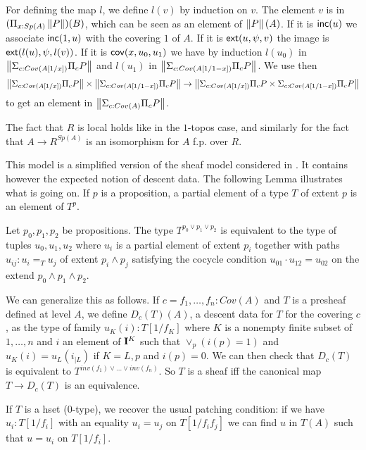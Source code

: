 For defining the map $l$, we define $l(v)$ by induction on $v$.
The element $v$ is in $(\Pi_{x:Sp(A)}\left\lVert P \right\rVert)(B)$, which can be seen as
an element of $\left\lVert P \right\rVert(A)$. If it is $\mathsf{inc}(u)$ we associate $\mathsf{inc}(1,u)$ with the covering $1$ of $A$.
If it is $\mathsf{ext}(u,\psi,v)$ the image is $\mathsf{ext}(l(u),\psi,l(v))$.
If it is $\mathsf{cov}(x,u_0,u_1)$ we have by induction $l(u_0)$ in $\left\lVert \Sigma_{c:Cov(A[1/x])}\Pi_c P \right\rVert$ and
  $l(u_1)$ in $\left\lVert \Sigma_{c:Cov(A[1/1-x])}\Pi_c P \right\rVert$. We use then 
  $$
\left\lVert \Sigma_{c:Cov(A[1/x])}\Pi_c P \right\rVert\times\left\lVert \Sigma_{c:Cov(A[1/1-x])}\Pi_c P \right\rVert\rightarrow
\left\lVert {\Sigma_{c:Cov(A[1/x])}\Pi_c P}\times{\Sigma_{c:Cov(A[1/1-x])}\Pi_c P} \right\rVert
  $$
to get an element in $\left\lVert \Sigma_{c:Cov(A)}\Pi_c P \right\rVert$.

\medskip

The fact that $R$ is local holds like in the $1$-topos case, and similarly for the fact that
$A\rightarrow R^{Sp(A)}$ is an isomorphism for $A$ f.p. over $R$.

\medskip

 This model is a  simplified version of the sheaf model considered in \cite{CRS21}. It contains however the expected notion
of descent data. The following Lemma illustrates what is going on. If $p$ is a proposition, a partial element of a type $T$ of
extent $p$ is an element of $T^p$.

\begin{lemma}
  Let $p_0,p_1,p_2$ be propositions. The type $T^{p_0\vee p_1\vee p_2}$ is equivalent to the type of tuples $u_0,u_1,u_2$
  where $u_i$ is a partial element of extent $p_i$ together with paths $u_{ij}:u_i =_T u_j$ of extent $p_i\wedge p_j$
  satisfying the cocycle condition $u_{01}\cdot u_{12} = u_{02}$ on the extend $p_0\wedge p_1\wedge p_2$.
\end{lemma}

We can generalize this as follows. If $c = f_1,\dots,f_n:Cov(A)$  and $T$ is a presheaf defined at level $A$, we define
$D_c(T)(A)$, a descent data for $T$ for the covering $c$, as the type of family $u_K(i):T[1/f_K]$ where $K$ is a nonempty
finite subset of $1,\dots,n$ and $i$ an element of $\mathbf{I}^K$ such that $\vee_p (i(p) = 1)$ and $u_K(i) = u_L(i_{|L})$
if $K = L,p$ and $i(p) = 0$. We can then check that $D_c(T)$ is equivalent to $T^{inv(f_1)\vee\dots\vee inv(f_n)}$.
So $T$ is a sheaf iff the canonical map $T\rightarrow D_c(T)$ is an equivalence.

\medskip

If $T$ is a hset ($0$-type), we recover the usual patching condition: if we have $u_i:T[1/f_i]$ with an equality $u_i = u_j$ on
$T[1/f_if_j]$ we can find $u$ in $T(A)$ such that $u = u_i$ on $T[1/f_i]$.

